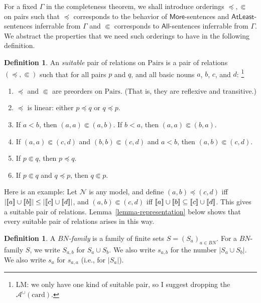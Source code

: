 \documentclass[letterpaper]{article} %
\theoremstyle{definition}
\newtheorem{definition}[theorem]{Definition}
\newcommand{\semantics}[1]{[\![\mbox{\em $ #1 $\/}]\!]}
\newcommand{\Nodel}{\mathcal{N}}
\newcommand{\rem}[1]{\relax}
\newcommand{\Aunion}{\mathscr{A}^{\cup}}
\newcommand{\AllNoArgs}{\mathsf{All}}
\newcommand{\AtleastNoArgs}{\mathsf{AtLeast}}
\newcommand{\MoreNoArgs}{\mathsf{More}}
\newcommand{\card}{\mathrm{card}}
\newcommand{\Pairs}{\mbox{Pairs}}
\newcommand{\precsubseteq}{\Subset}
\newcommand{\suitable}{suitable}%
\begin{document}
{\rem{We think of $(a,b)$ as the union term $a\cup b$.
And so $(a,a)$ then corresponds to the basic term $a$.}

For a fixed $\Gamma$ in the completeness theorem,
we shall introduce orderings $\preceq, \precsubseteq$ on pairs such that $\preceq$ corresponds to the behavior of $\MoreNoArgs$-sentences and $\AtleastNoArgs$-sentences inferrable from $\Gamma$ and $\precsubseteq$ corresponds to $\AllNoArgs$-sentences inferrable from $\Gamma$.  We abstract the properties that we need such orderings to have in the following definition.

\rem{We abstract the properties 
of interpretations in models in the following definition.}

\begin{definition}
An \emph{\suitable}
pair of relations on $\Pairs$ 
is a pair of relations $(\preceq, \precsubseteq)$ such that for all
pairs $p$ and $q$, and all basic nouns $a$, $b$, $c$, and $d$:
\footnote{LM: we only have one kind of
suitable pair, so I suggest dropping the $\Aunion(\card)$.}

\begin{enumerate}
\item $\preceq$ and $\precsubseteq$ are preorders on $\Pairs$.
(That is, they are reflexive and transitive.)
\item   $\preceq$ is linear:
 either $p \preceq q$ or $q \preceq p$.
 \item If $a < b$, then $(a,a) \precsubseteq (a,b)$.  If $b < a$, then $(a,a) \precsubseteq (b,a)$. 
 \item If $(a,a) \precsubseteq (c,d)$ and $(b,b) \precsubseteq (c,d)$ and $a < b$,
 then $(a,b) \precsubseteq (c,d)$.
\item If $p \precsubseteq q$, then $p\preceq q$.
\item If $p \precsubseteq q$ and $q\preceq p$, then $q \precsubseteq p$.
\end{enumerate}
\label{def-suitable-pair}
\end{definition}


Here is an example:
Let $\Nodel$ is any model, and define $(a,b) \preceq (c,d)$ iff 
$|\semantics{a} \cup \semantics{b}| \leq
|\semantics{c} \cup \semantics{d}|$, and 
 $(a,b) \precsubseteq (c,d)$ iff 
$\semantics{a} \cup \semantics{b} \subseteq
\semantics{c} \cup \semantics{d}$.
This gives a suitable pair of relations.
Lemma~\ref{lemma-representation} below shows that every suitable pair of relations arises in
this way.


\begin{definition}
 A  \emph{$BN$-family} is  a family of  finite sets
$S = (S_a)_{a\in BN}$.
For a $BN$-family $S$, we write $S_{a,b}$ for $S_a \cup S_b$.  We also write $s_{a,b}$
for the number $|S_a\cup S_b|$. 
We also write $s_a$ for $s_{a,a}$ (i.e., for $|S_a|$).


\end{definition}}
\end{document}
